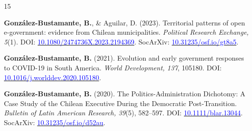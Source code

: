 \begin{publications}
\begin{benumerate}{15}
\item{{\bfseries González-Bustamante, B.}, \& Aguilar, D. (2023). Territorial patterns of open e-government: evidence from Chilean municipalities. {\itshape Political Research Exchange, 5}(1). DOI: \href{https://doi.org/10.1080/2474736X.2023.2194369}{\textcolor{blue}{10.1080/2474736X.2023.2194369}}. SocArXiv: \href{https://doi.org/10.31235/osf.io/gt8a5}{\textcolor{blue}{10.31235/osf.io/gt8a5}}.}\vspace{1mm}

\item{{\bfseries González-Bustamante, B.} (2021). Evolution and early government responses to COVID-19 in South America. {\itshape World Development, 137}, 105180. DOI: \href{https://doi.org/10.1016/j.worlddev.2020.105180}{\textcolor{blue}{10.1016/j.worlddev.2020.105180}}.}\vspace{1mm}


\item{{\bfseries González-Bustamante, B.} (2020). The Politics-Administration Dichotomy: A Case Study of the Chilean Executive During the Democratic Post-Transition. {\itshape Bulletin of Latin American Research, 39}(5), 582--597. DOI: \href{https://doi.org/10.1111/blar.13044}{\textcolor{blue}{10.1111/blar.13044}}. SocArXiv: \href{https://doi.org/10.31235/osf.io/d52au}{\textcolor{blue}{10.31235/osf.io/d52au}}.}\vspace{1mm}



\end{benumerate}
\end{publications}
